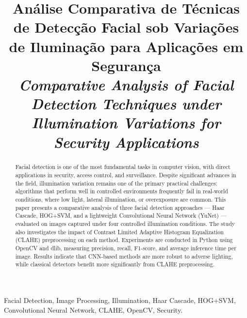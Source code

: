 \documentclass[conference]{IEEEtran}
\begin{document}
\title{An\'alise Comparativa de T\'ecnicas de Detec\c{c}\~ao Facial sob Varia\c{c}\~oes de Ilumina\c{c}\~ao para Aplica\c{c}\~oes em Seguran\c{c}a\\
{\footnotesize \textit{Comparative Analysis of Facial Detection Techniques under Illumination Variations for Security Applications}}
}

\author{
}

\maketitle

\begin{abstract}
Facial detection is one of the most fundamental tasks in computer vision, with direct applications in security, access control, and surveillance. Despite significant advances in the field, illumination variation remains one of the primary practical challenges: algorithms that perform well in controlled environments frequently fail in real-world conditions, where low light, lateral illumination, or overexposure are common. This paper presents a comparative analysis of three facial detection approaches --- Haar Cascade, HOG+SVM, and a lightweight Convolutional Neural Network (YuNet) --- evaluated on images captured under four controlled illumination conditions. The study also investigates the impact of Contrast Limited Adaptive Histogram Equalization (CLAHE) preprocessing on each method. Experiments are conducted in Python using OpenCV and dlib, measuring precision, recall, F1-score, and average inference time per image. Results indicate that CNN-based methods are more robust to adverse lighting, while classical detectors benefit more significantly from CLAHE preprocessing.
\end{abstract}

\begin{IEEEkeywords}
Facial Detection, Image Processing, Illumination, Haar Cascade, HOG+SVM, Convolutional Neural Network, CLAHE, OpenCV, Security.
\end{IEEEkeywords}

\end{document}
